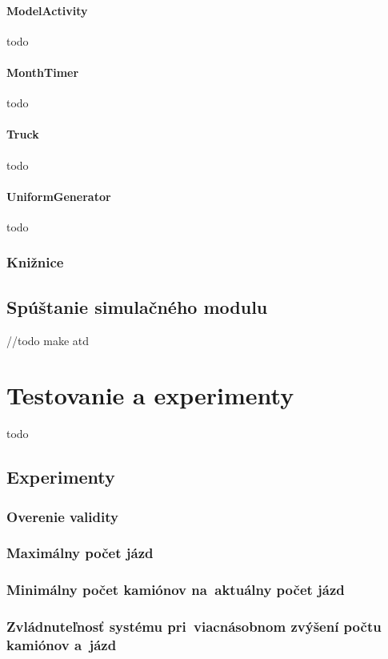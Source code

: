 \documentclass[a4paper, 11pt]{article}
\begin{document}
    \paragraph{ModelActivity}
    todo
    \paragraph{MonthTimer}
    todo
    \paragraph{Truck}
    todo
    \paragraph{UniformGenerator}
    todo

    \subsubsection{Knižnice}

    \subsection{Spúštanie simulačného modulu}
    //todo make atd

    \newpage
	\section{Testovanie a experimenty}
	todo 
    \subsection{Experimenty}
    \subsubsection{Overenie validity}
    \subsubsection{Maximálny počet jázd}
    \subsubsection{Minimálny počet kamiónov na~aktuálny počet jázd}
    \subsubsection{Zvládnuteľnosť systému pri~viacnásobnom zvýšení počtu kamiónov a~jázd}
\end{document}
